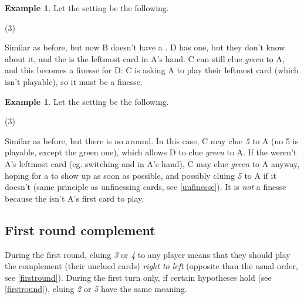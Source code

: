 \documentclass[a4paper]{article}
\theoremstyle{plain}
\theoremstyle{definition}
\newtheorem{example}[theorem]{Example}
\begin{document}
\begin{example}
	
	Let the setting be the following.
	
	\begin{tasks}(3)
		\task[+]      
		\task[A]    
		\task[B]    
		\task[C]    
		\task[D]    
		\task[E]    
	\end{tasks}
	
	Similar as before, but now B doesn't have a . D has one, but they don't know about it, and the  is the leftmost card in A's hand. C can still clue \textit{green} to A, and this becomes a finesse for D: C is asking A to play their leftmost card (which isn't playable), so it must be a finesse.
\end{example}

\begin{example}
	
	Let the setting be the following.
	
	\begin{tasks}(3)
		\task[+]      
		\task[A]    
		\task[B]    
		\task[C]    
		\task[D]    
		\task[E]    
	\end{tasks}
	
	Similar as before, but there is no  around. In this case, C may clue \textit{5} to A (no 5 is playable, except the green one), which allows D to clue \textit{green} to A. If the  weren't A's leftmost card (eg. switching  and  in A's hand), C may clue \textit{green} to A anyway, hoping for a  to show up as soon as possible, and possibly cluing \textit{5} to A if it doesn't (same principle as unfinessing cards, see \ref{unfinesse}). It is \textit{not} a finesse because the  isn't A's first card to play.
\end{example}

\subsection{First round complement}
\label{firstroundcomplement}

During the first round, cluing \textit{3} or \textit{4} to any player means that they should play the complement (their unclued cards) \textit{right to left} (opposite than the usual order, see \ref{firstround}). During the first turn only, if certain hypotheses hold (see \ref{firstround}), cluing \textit{2} or \textit{5} have the same meaning.
\end{document}
